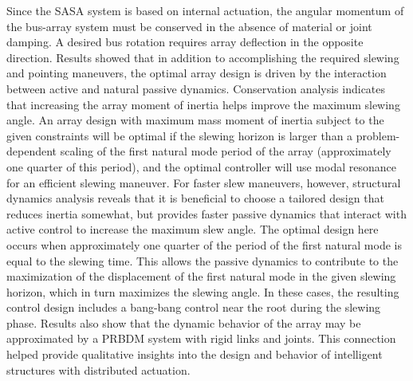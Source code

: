 Since the SASA system is based on internal actuation, the angular momentum of the bus-array system must be conserved in the absence of material or joint damping. A desired bus rotation requires array deflection in the opposite direction. Results showed that in addition to accomplishing the required slewing and pointing maneuvers, the optimal array design is driven by the interaction between active and natural passive dynamics. Conservation analysis indicates that increasing the array moment of inertia helps improve the maximum slewing angle. An array design with maximum mass moment of inertia subject to the given constraints will be optimal if the slewing horizon is larger than a problem-dependent scaling of the first natural mode period of the array (approximately one quarter of this period), and the optimal controller will use modal resonance for an efficient slewing maneuver. For faster slew maneuvers, however, structural dynamics analysis reveals that it is beneficial to choose a tailored design that reduces inertia somewhat, but provides faster passive dynamics that interact with active control to increase the maximum slew angle. The optimal design here occurs when approximately one quarter of the period of the first natural mode is equal to the slewing time. This allows the passive dynamics to contribute to the maximization of the displacement of the first natural mode in the given slewing horizon, which in turn maximizes the slewing angle. In these cases, the resulting control design includes a bang-bang control near the root during the slewing phase. Results also show that the dynamic behavior of the array may be approximated by a PRBDM system with rigid links and joints. This connection helped provide qualitative insights into the design and behavior of intelligent structures with distributed actuation.